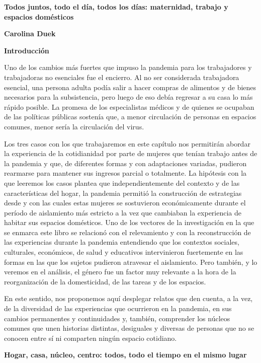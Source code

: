 \textbf{Todos juntos, todo el día, todos los días: maternidad, trabajo y espacios domésticos}

\textbf{Carolina Duek}

\textbf{Introducción}

Uno de los cambios más fuertes que impuso la pandemia para los trabajadores y trabajadoras no esenciales fue el encierro. Al no ser considerada trabajadora esencial, una persona adulta podía salir a hacer compras de alimentos y de bienes necesarios para la subsistencia, pero luego de eso debía regresar a su casa lo más rápido posible. La promesa de los especialistas médicos y de quienes se ocupaban de las políticas públicas sostenía que, a menor circulación de personas en espacios comunes, menor sería la circulación del virus.

Los tres casos con los que trabajaremos en este capítulo nos permitirán abordar la experiencia de la cotidianidad por parte de mujeres que tenían trabajo antes de la pandemia y que, de diferentes formas y con adaptaciones variadas, pudieron rearmarse para mantener sus ingresos parcial o totalmente. La hipótesis con la que leeremos los casos plantea que independientemente del contexto y de las características del hogar, la pandemia permitió la construcción de estrategias desde y con las cuales estas mujeres se sostuvieron económicamente durante el período de aislamiento más estricto a la vez que cambiaban la experiencia de habitar sus espacios domésticos. Uno de los vectores de la investigación en la que se enmarca este libro se relacionó con el relevamiento y con la reconstrucción de las experiencias durante la pandemia entendiendo que los contextos sociales, culturales, económicos, de salud y educativos intervinieron fuertemente en las formas en las que los sujetos pudieron atravesar el aislamiento. Pero también, y lo veremos en el análisis, el género fue un factor muy relevante a la hora de la reorganización de la domesticidad, de las tareas y de los espacios.

En este sentido, nos proponemos aquí desplegar relatos que den cuenta, a la vez, de la diversidad de las experiencias que ocurrieron en la pandemia, en sus cambios permanentes y continuidades y, también, comprender los núcleos comunes que unen historias distintas, desiguales y diversas de personas que no se conocen entre sí ni comparten ningún espacio cotidiano.

\textbf{Hogar, casa, núcleo, centro: todos, todo el tiempo en el mismo lugar}

